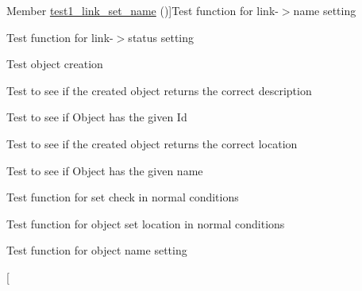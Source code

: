 \begin{DoxyRefList}
\hypertarget{test__test000127}{}%
Member \hyperlink{link__test_8h_ae0e478a0540bed26befc071591e3ff6c}{test1\+\_\+link\+\_\+set\+\_\+name} ()]Test function for link-\/$>$name setting  
\item[\label{test__test000133}%
\hypertarget{test__test000133}{}%
Member \hyperlink{link__test_8h_a3b39fdba0c3c967716572bfb01beec27}{test1\+\_\+link\+\_\+set\+\_\+status} ()]Test function for link-\/$>$status setting  
\item[\label{test__test000146}%
\hypertarget{test__test000146}{}%
Member \hyperlink{object__test_8h_a3836d69f92ce7149d56bafcaec83f516}{test1\+\_\+object\+\_\+create} ()]Test object creation  
\item[\label{test__test000162}%
\hypertarget{test__test000162}{}%
Member \hyperlink{object__test_8h_a73c676e5d625179d75b96eed035a0876}{test1\+\_\+object\+\_\+get\+\_\+check} ()]Test to see if the created object returns the correct description  
\item[\label{test__test000158}%
\hypertarget{test__test000158}{}%
Member \hyperlink{object__test_8h_aa88e9e9dab92ba9c58851d7a7a8415f0}{test1\+\_\+object\+\_\+get\+\_\+id} ()]Test to see if Object has the given Id  
\item[\label{test__test000160}%
\hypertarget{test__test000160}{}%
Member \hyperlink{object__test_8h_ac62fbd4db0970e9942aa900a3ee2bba4}{test1\+\_\+object\+\_\+get\+\_\+location} ()]Test to see if the created object returns the correct location  
\item[\label{test__test000156}%
\hypertarget{test__test000156}{}%
Member \hyperlink{object__test_8h_ad2411bc3cc47c9905e63a3d9c561d369}{test1\+\_\+object\+\_\+get\+\_\+name} ()]Test to see if Object has the given name  
\item[\label{test__test000154}%
\hypertarget{test__test000154}{}%
Member \hyperlink{object__test_8h_a7e652e4dcf897db42363f6098bc1c3da}{test1\+\_\+object\+\_\+set\+\_\+check} ()]Test function for set check in normal conditions  
\item[\label{test__test000151}%
\hypertarget{test__test000151}{}%
Member \hyperlink{object__test_8h_aeed901e95aa669185059c85183e68a24}{test1\+\_\+object\+\_\+set\+\_\+location} ()]Test function for object set location in normal conditions  
\item[\label{test__test000148}%
\hypertarget{test__test000148}{}%
Member \hyperlink{object__test_8h_a74e25ad653c4a32b9922fff8e4f916fd}{test1\+\_\+object\+\_\+set\+\_\+name} ()]Test function for object name setting  
\item[\label{test__test000189}%

\end{DoxyRefList}
